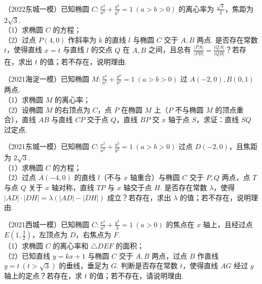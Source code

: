 \begin{example} %
（2022东城一模）已知椭圆 $C:\frac{x^2}{a^2}+\frac{y^2}{b^2}=1\ (a>b>0)$ 的离心率为 $\frac{\sqrt{3}}{2}$，焦距为 $2\sqrt{3}$.\\
（1）求椭圆 $C$ 的方程；\\
（2）过点 $P(4,0)$ 作斜率为 $k$ 的直线 $l$ 与椭圆 $C$ 交于 $A,B$ 两点. 是否存在常数 $t$，使得直线 $x=t$ 与直线 $l$ 的交点 $Q$ 在 $A,B$ 之间，且总有 $\frac{\lvert PA\rvert}{\lvert PB\rvert}=\frac{\lvert QA\rvert}{\lvert QB\rvert}$？若存在，求出 $t$ 的值；若不存在，说明理由.
\end{example}

\begin{example} %
（2021海淀一模）已知椭圆 $M:\frac{x^2}{a^2}+\frac{y^2}{b^2}=1\ (a>b>0)$ 过 $A(-2,0),B(0,1)$ 两点.\\
（1）求椭圆 $M$ 的离心率；\\
（2）设椭圆 $M$ 的右顶点为 $C$，点 $P$ 在椭圆 $M$ 上（$P$ 不与椭圆 $M$ 的顶点重合），直线 $AB$ 与直线 $CP$ 交于点 $Q$，直线 $BP$ 交 $x$ 轴于点 $S$，求证：直线 $SQ$ 过定点.
\end{example}

\begin{example} %
（2021东城一模）已知椭圆 $C:\frac{x^2}{a^2}+\frac{y^2}{b^2}=1\ (a>b>0)$ 过点 $D(-2,0)$，且焦距为 $2\sqrt{3}$.\\
（1）求椭圆 $C$ 的方程；\\
（2）过点 $A(-4,0)$ 的直线 $l$（不与 $x$ 轴重合）与椭圆 $C$ 交于 $P,Q$ 两点，点 $T$ 与点 $Q$ 关于 $x$ 轴对称，直线 $TP$ 与 $x$ 轴交于点 $H$. 是否存在常数 $\lambda$，使得 $\lvert AD\rvert\cdot\lvert DH\rvert=\lambda(\lvert AD\rvert-\lvert DH\rvert)$ 成立？若存在，求出 $\lambda$ 的值；若不存在，说明理由.
\end{example}

\begin{example} %
（2021西城一模）已知椭圆 $C:\frac{x^2}{a^2}+\frac{y^2}{3}=1\ (a>0)$ 的焦点在 $x$ 轴上，且经过点 $E\left(1,\frac{3}{2}\right)$，左顶点为 $D$，右焦点为 $F$.\\
（1）求椭圆 $C$ 的离心率和 $\triangle DEF$ 的面积；\\
（2）已知直线 $y=kx+1$ 与椭圆 $C$ 交于 $A,B$ 两点，过点 $B$ 作直线 $y=t\ (t>\sqrt{3})$ 的垂线，垂足为 $G$. 判断是否存在常数 $t$，使得直线 $AG$ 经过 $y$ 轴上的定点？若存在，求 $t$ 的值；若不存在，请说明理由.
\end{example}

